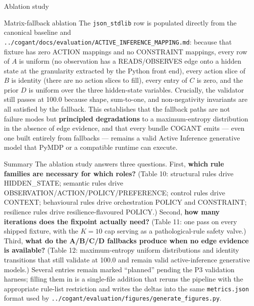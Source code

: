 \documentclass[
  ignorenonframetext,
]{beamer}
\begin{document}
\begin{frame}[fragile]{Ablation study}
\begin{block}{Matrix-fallback ablation}
The \texttt{json\_stdlib} row is populated directly from the canonical
baseline and
\texttt{../cogant/docs/evaluation/ACTIVE\_INFERENCE\_MAPPING.md}:
because that fixture has zero ACTION mappings and no CONSTRAINT
mappings, every row of \(A\) is uniform (no observation has a
READS/OBSERVES edge onto a hidden state at the granularity extracted by
the Python front end), every action slice of \(B\) is identity (there
are no action slices to fill), every entry of \(C\) is zero, and the
prior \(D\) is uniform over the three hidden-state variables. Crucially,
the validator still passes at 100.0 because shape, sum-to-one, and
non-negativity invariants are all satisfied by the fallback. This
establishes that the fallback paths are not failure modes but
\textbf{principled degradations} to a maximum-entropy distribution in
the absence of edge evidence, and that every bundle COGANT emits ---
even one built entirely from fallbacks --- remains a valid Active
Inference generative model that PyMDP or a compatible runtime can
execute.
\end{block}

\begin{block}{Summary}
\protect{}\label{summary}
The ablation study answers three questions. First, \textbf{which rule
families are necessary for which roles?} (Table 10: structural rules
drive HIDDEN\_STATE; semantic rules drive
OBSERVATION/ACTION/POLICY/PREFERENCE; control rules drive CONTEXT;
behavioural rules drive orchestration POLICY and CONSTRAINT; resilience
rules drive resilience-flavoured POLICY.) Second, \textbf{how many
iterations does the fixpoint actually need?} (Table 11: one pass on
every shipped fixture, with the \(K = 10\) cap serving as a
pathological-rule safety valve.) Third, \textbf{what do the A/B/C/D
fallbacks produce when no edge evidence is available?} (Table 12:
maximum-entropy uniform distributions and identity transitions that
still validate at 100.0 and remain valid active-inference generative
models.) Several entries remain marked ``planned'' pending the P3
validation harness; filling them in is a single-file addition that
reruns the pipeline with the appropriate rule-list restriction and
writes the deltas into the same \texttt{metrics.json} format used by
\texttt{../cogant/evaluation/figures/generate\_figures.py}.
\end{block}
\end{frame}
\end{document}
